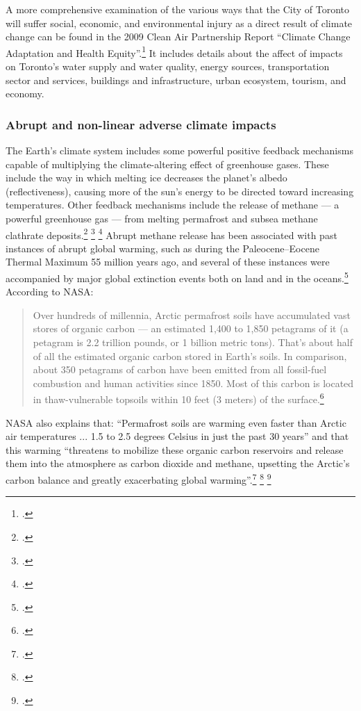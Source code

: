 A more comprehensive examination of the various ways that the City of Toronto will suffer social, economic, and environmental injury as a direct result of climate change can be found in the 2009 Clean Air Partnership Report ``Climate Change Adaptation and Health Equity''.\footcite[][]{CCAHealthEquity}
It includes details about the affect of impacts on Toronto's water supply and water quality, energy sources, transportation sector and services, buildings and infrastructure, urban ecosystem, tourism, and economy.  



	\subsubsection{Abrupt and non-linear adverse climate impacts}



The Earth's climate system includes some powerful positive feedback mechanisms capable of multiplying the climate-altering effect of greenhouse gases.
These include the way in which melting ice decreases the planet's albedo (reflectiveness), causing more of the sun's energy to be directed toward increasing temperatures.
Other feedback mechanisms include the release of methane --- a powerful greenhouse gas --- from melting permafrost and subsea methane clathrate deposits.\footcite[See: ][]{VastCostsArctic} \footcite[See also: ][]{Thermokast2013} \footcite[See also: ][]{VidalTimebomb}
Abrupt methane release has been associated with past instances of abrupt global warming, such as during the Paleocene–Eocene Thermal Maximum 55 million years ago, and several of these instances were accompanied by major global extinction events both on land and in the oceans.\footcite[See: ][]{Hansen2010}
According to NASA:
\begin{quote}
Over hundreds of millennia, Arctic permafrost soils have accumulated vast stores of organic carbon --- an estimated 1,400 to 1,850 petagrams of it (a petagram is 2.2 trillion pounds, or 1 billion metric tons). That's about half of all the estimated organic carbon stored in Earth's soils. In comparison, about 350 petagrams of carbon have been emitted from all fossil-fuel combustion and human activities since 1850. Most of this carbon is located in thaw-vulnerable topsoils within 10 feet (3 meters) of the surface.\footcite[][]{SleepingGiant}
\end{quote}
NASA also explains that: ``Permafrost soils are warming even faster than Arctic air temperatures ... 1.5 to 2.5 degrees Celsius in just the past 30 years'' and that this warming ``threatens to mobilize these organic carbon reservoirs and release them into the atmosphere as carbon dioxide and methane, upsetting the Arctic's carbon balance and greatly exacerbating global warming''.\footcite[][]{SleepingGiant} \footcite[See also: ][p. 183--6]{Vaks2013} \footcite[][]{15permafrost}




